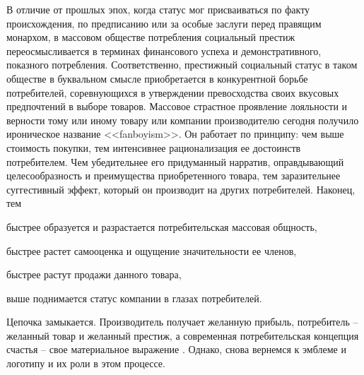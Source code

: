 В отличие от прошлых эпох, когда статус мог присваиваться по факту происхождения,
по предписанию или за особые заслуги перед правящим монархом, в массовом обществе
потребления социальный престиж переосмысливается в терминах финансового успеха и
демонстративного, показного потребления. Соответственно, престижный социальный статус
в таком обществе в буквальном смысле приобретается в конкурентной борьбе потребителей,
соревнующихся в утверждении превосходства своих вкусовых предпочтений в выборе товаров.
Массовое страстное проявление лояльности и верности тому или иному товару или компании
производителю сегодня получило ироническое название
<<fanboyism>>\autocite{mcraney2011you}.
Он работает по принципу: чем выше стоимость покупки, тем интенсивнее рационализация
ее достоинств потребителем. Чем убедительнее его придуманный нарратив, оправдывающий
целесообразность и преимущества приобретенного товара, тем заразительнее
суггестивный эффект, который он производит на других потребителей. Наконец, тем
\begin{enumerate*}[label=\asbuk*)]
\item быстрее образуется и разрастается потребительская массовая общность,
\item быстрее растет самооценка и ощущение значительности ее членов,
\item быстрее растут продажи данного товара,
\item выше поднимается статус компании в глазах потребителей.
\end{enumerate*}
Цепочка замыкается. Производитель получает желанную прибыль, потребитель --
желанный товар и желанный престиж, а современная потребительская концепция счастья --
свое материальное выражение \autocite[][15-23]{lebedev2012}. Однако, снова вернемся к эмблеме и логотипу и их
роли в этом процессе.

